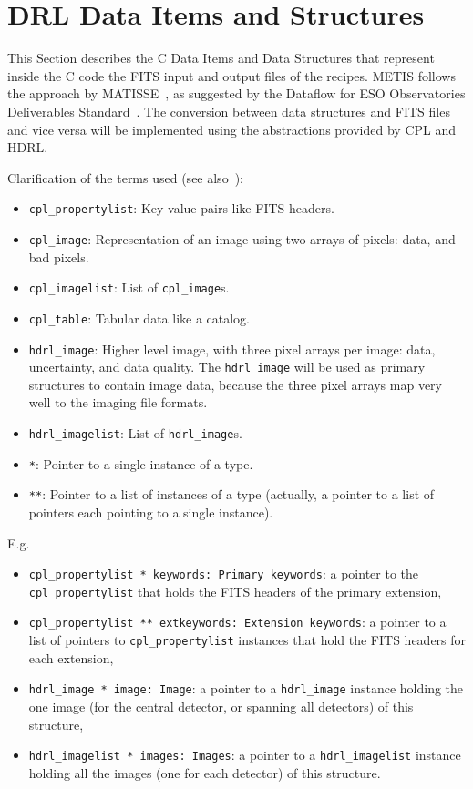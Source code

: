 \clearpage
\section{DRL Data Items and Structures}\label{sec:drl_data_structures}


This Section describes the C Data Items and Data Structures that represent inside the C code the FITS input and output files of the recipes. \ac{METIS} follows the approach by MATISSE~\cite{MATISSE-DRLD}, as suggested by the Dataflow for ESO Observatories Deliverables Standard~\cite{1618}.
The conversion between data structures and \ac{FITS} files and vice versa will be implemented using the abstractions provided by \ac{CPL} and \ac{HDRL}. 

Clarification of the terms used (see also~\cite{hdrl-manual}):
\begin{itemize}
    \item \texttt{cpl\_propertylist}: Key-value pairs like \ac{FITS} headers.
    \item \texttt{cpl\_image}: Representation of an image using two arrays of pixels: data, and bad pixels.
    \item \texttt{cpl\_imagelist}: List of \texttt{cpl\_image}s.
    \item \texttt{cpl\_table}: Tabular data like a catalog.
    \item \texttt{hdrl\_image}: Higher level image, with three pixel arrays per image: data, uncertainty, and data quality.
          The \texttt{hdrl\_image} will be used as primary structures to contain image data, because the three pixel arrays map very well to the imaging file formats.
    \item \texttt{hdrl\_imagelist}: List of \texttt{hdrl\_image}s.
    \item \texttt{*}: Pointer to a single instance of a type.
    \item \texttt{**}: Pointer to a list of instances of a type (actually, a pointer to a list of pointers each pointing to a single instance).
\end{itemize}

E.g.
\begin{itemize}
    \item \texttt{cpl\_propertylist * keywords: Primary keywords}: a pointer to the \texttt{cpl\_propertylist} that holds the \ac{FITS} headers of the primary extension,
    \item \texttt{cpl\_propertylist ** extkeywords: Extension keywords}: a pointer to a list of pointers to \texttt{cpl\_propertylist} instances that hold the \ac{FITS} headers for each extension,
    \item \texttt{hdrl\_image * image: Image}: a pointer to a \texttt{hdrl\_image} instance holding the one image (for the central detector, or spanning all detectors) of this structure,
    \item \texttt{hdrl\_imagelist * images: Images}: a pointer to a \texttt{hdrl\_imagelist} instance holding all the images (one for each detector) of this structure.
\end{itemize}

